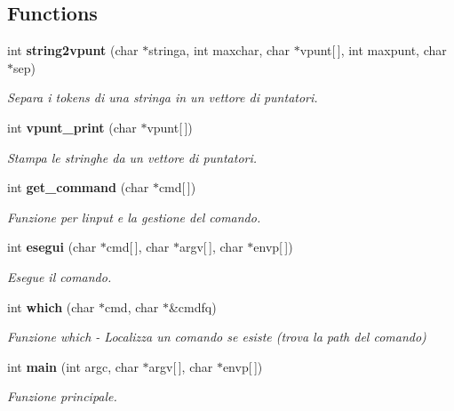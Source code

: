 \subsection*{Functions}
\begin{DoxyCompactItemize}
\item 
int {\bf string2vpunt} (char $\ast$stringa, int maxchar, char $\ast$vpunt[$\,$], int maxpunt, char $\ast$sep)
\begin{DoxyCompactList}\small\item\em Separa i tokens di una stringa in un vettore di puntatori. \end{DoxyCompactList}\item 
int {\bf vpunt\+\_\+print} (char $\ast$vpunt[$\,$])
\begin{DoxyCompactList}\small\item\em Stampa le stringhe da un vettore di puntatori. \end{DoxyCompactList}\item 
int {\bf get\+\_\+command} (char $\ast$cmd[$\,$])
\begin{DoxyCompactList}\small\item\em Funzione per l\textquotesingle{}input e la gestione del comando. \end{DoxyCompactList}\item 
int {\bf esegui} (char $\ast$cmd[$\,$], char $\ast$argv[$\,$], char $\ast$envp[$\,$])
\begin{DoxyCompactList}\small\item\em Esegue il comando. \end{DoxyCompactList}\item 
int {\bf which} (char $\ast$cmd, char $\ast$\&cmdfq)
\begin{DoxyCompactList}\small\item\em Funzione which -\/ Localizza un comando se esiste (trova la path del comando) \end{DoxyCompactList}\item 
int {\bf main} (int argc, char $\ast$argv[$\,$], char $\ast$envp[$\,$])
\begin{DoxyCompactList}\small\item\em Funzione principale. \end{DoxyCompactList}\end{DoxyCompactItemize}
